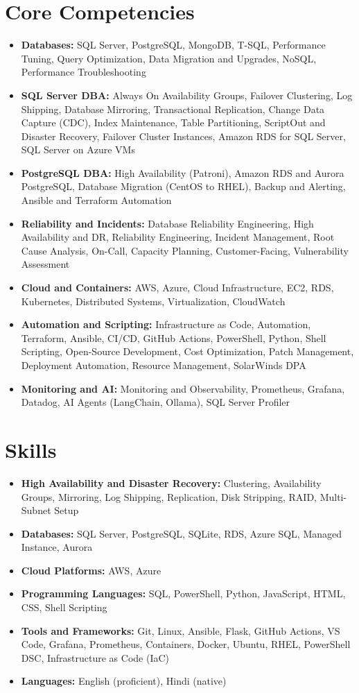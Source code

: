 \documentclass[10pt,a4paper]{article}
\begin{document}
\section{Core Competencies}
\begin{itemize}
  \item \textbf{Databases:} SQL Server, PostgreSQL, MongoDB, T-SQL, Performance Tuning, Query Optimization, Data Migration and Upgrades, NoSQL, Performance Troubleshooting
  \item \textbf{SQL Server DBA:} Always On Availability Groups, Failover Clustering, Log Shipping, Database Mirroring, Transactional Replication, Change Data Capture (CDC), Index Maintenance, Table Partitioning, ScriptOut and Disaster Recovery, Failover Cluster Instances, Amazon RDS for SQL Server, SQL Server on Azure VMs
  \item \textbf{PostgreSQL DBA:} High Availability (Patroni), Amazon RDS and Aurora PostgreSQL, Database Migration (CentOS to RHEL), Backup and Alerting, Ansible and Terraform Automation
  \item \textbf{Reliability and Incidents:} Database Reliability Engineering, High Availability and DR, Reliability Engineering, Incident Management, Root Cause Analysis, On-Call, Capacity Planning, Customer-Facing, Vulnerability Assessment
  \item \textbf{Cloud and Containers:} AWS, Azure, Cloud Infrastructure, EC2, RDS, Kubernetes, Distributed Systems, Virtualization, CloudWatch
  \item \textbf{Automation and Scripting:} Infrastructure as Code, Automation, Terraform, Ansible, CI/CD, GitHub Actions, PowerShell, Python, Shell Scripting, Open-Source Development, Cost Optimization, Patch Management, Deployment Automation, Resource Management, SolarWinds DPA
  \item \textbf{Monitoring and AI:} Monitoring and Observability, Prometheus, Grafana, Datadog, AI Agents (LangChain, Ollama), SQL Server Profiler
\end{itemize}

\section{Skills}
\begin{itemize}
  \item \textbf{High Availability and Disaster Recovery:} Clustering, Availability Groups, Mirroring, Log Shipping, Replication, Disk Stripping, RAID, Multi-Subnet Setup
  \item \textbf{Databases:} SQL Server, PostgreSQL, SQLite, RDS, Azure SQL, Managed Instance, Aurora
  \item \textbf{Cloud Platforms:} AWS, Azure
  \item \textbf{Programming Languages:} SQL, PowerShell, Python, JavaScript, HTML, CSS, Shell Scripting
  \item \textbf{Tools and Frameworks:} Git, Linux, Ansible, Flask, GitHub Actions, VS Code, Grafana, Prometheus, Containers, Docker, Ubuntu, RHEL, PowerShell DSC, Infrastructure as Code (IaC)
  \item \textbf{Languages:} English (proficient), Hindi (native)
\end{itemize}
\end{document}
